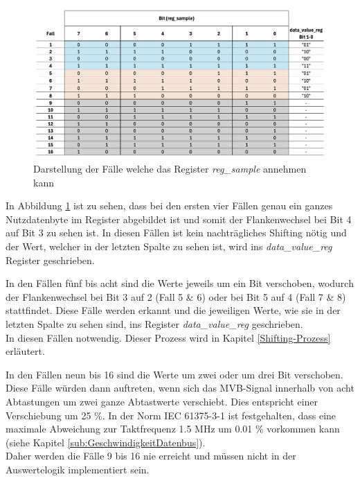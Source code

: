 \begin{figure}[H]
    \centering
    \includegraphics[width=1\linewidth]{Figures//Chap3//FPGA/FPGA_decoding_case.png}
    \caption{Darstellung der Fälle welche das Register \textit{reg\_sample} annehmen kann}
    \label{fig:FPGAreg_sampleCases}
\end{figure}

In Abbildung \ref{fig:FPGAreg_sampleCases} ist zu sehen, dass bei den ersten vier
Fällen genau ein ganzes Nutzdatenbyte im Register abgebildet ist und somit der 
Flankenwechsel bei Bit 4 auf Bit 3 zu sehen ist. In diesen Fällen ist kein 
nachträgliches Shifting nötig und der Wert, welcher in der letzten Spalte zu
sehen ist, wird ins \textit{data\_value\_reg} Register geschrieben.

In den Fällen fünf bis acht sind die Werte jeweils um ein Bit verschoben, wodurch
der Flankenwechsel bei Bit 3 auf 2 (Fall 5 \& 6) oder bei Bit 5 auf 4
(Fall 7 \& 8) stattfindet. Diese Fälle werden erkannt und die jeweiligen Werte, wie
sie in der letzten Spalte zu sehen sind, ins Register \textit{data\_value\_reg} 
geschrieben.\\
In diesen Fällen notwendig. Dieser Prozess wird in Kapitel \ref{Shifting-Prozess}
erläutert.

In den Fällen neun bis 16 sind die Werte um zwei oder um drei Bit verschoben. Diese Fälle würden dann auftreten, wenn sich das MVB-Signal innerhalb von acht
Abtastungen um zwei ganze Abtastwerte verschiebt. Dies entspricht einer
Verschiebung um 25 \%. In der Norm IEC 61375-3-1 ist festgehalten, dass eine maximale Abweichung zur Taktfrequenz 1.5 MHz um 0.01 \% vorkommen kann (siehe Kapitel \ref{sub:GeschwindigkeitDatenbus}).\\
Daher werden die Fälle 9 bis 16 nie erreicht und müssen nicht in der Auswertelogik
implementiert sein.
 

